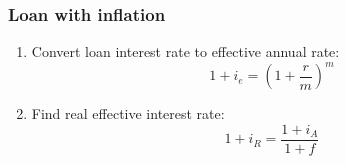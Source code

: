 \subsubsection{Loan with inflation}
    \begin{process}
        \begin{enumerate}
            \item Convert loan interest rate to effective annual rate:
            \begin{equation}
                1 + i_e = \left(1 + \frac{r}{m}\right)^m
            \end{equation}
        
            \item Find real effective interest rate:
            \begin{equation}
                1 + i_R = \frac{1 + i_A}{1 + f}
            \end{equation}
        \end{enumerate}
    \end{process}

